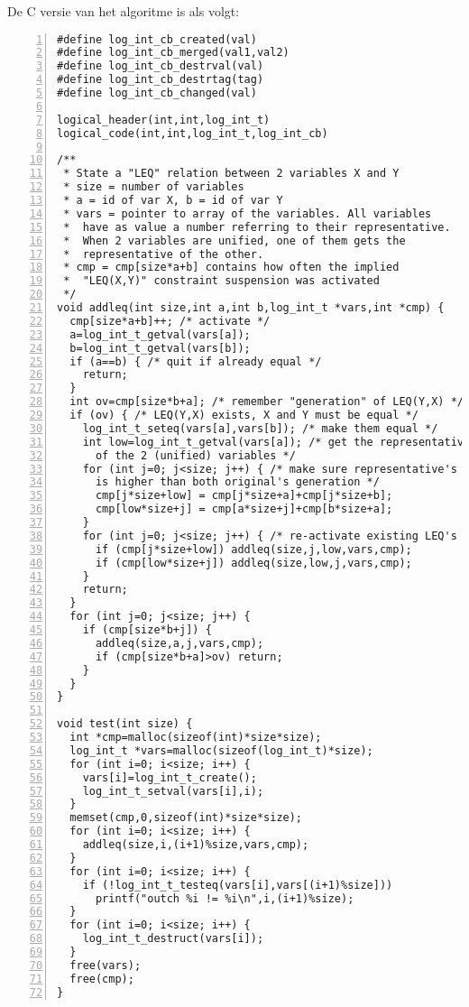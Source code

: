 \label{code:leq-c}

De C versie van het algoritme is als volgt:

{\scriptsize
\begin{Verbatim}[frame=single,numbers=left]
#define log_int_cb_created(val)
#define log_int_cb_merged(val1,val2)
#define log_int_cb_destrval(val)
#define log_int_cb_destrtag(tag)
#define log_int_cb_changed(val)

logical_header(int,int,log_int_t)
logical_code(int,int,log_int_t,log_int_cb)

/**
 * State a "LEQ" relation between 2 variables X and Y
 * size = number of variables
 * a = id of var X, b = id of var Y
 * vars = pointer to array of the variables. All variables
 *  have as value a number referring to their representative.
 *  When 2 variables are unified, one of them gets the
 *  representative of the other.
 * cmp = cmp[size*a+b] contains how often the implied
 *  "LEQ(X,Y)" constraint suspension was activated
 */
void addleq(int size,int a,int b,log_int_t *vars,int *cmp) {
  cmp[size*a+b]++; /* activate */
  a=log_int_t_getval(vars[a]);
  b=log_int_t_getval(vars[b]);
  if (a==b) { /* quit if already equal */
    return;
  }
  int ov=cmp[size*b+a]; /* remember "generation" of LEQ(Y,X) */
  if (ov) { /* LEQ(Y,X) exists, X and Y must be equal */
    log_int_t_seteq(vars[a],vars[b]); /* make them equal */
    int low=log_int_t_getval(vars[a]); /* get the representative 
      of the 2 (unified) variables */
    for (int j=0; j<size; j++) { /* make sure representative's generation
      is higher than both original's generation */
      cmp[j*size+low] = cmp[j*size+a]+cmp[j*size+b];
      cmp[low*size+j] = cmp[a*size+j]+cmp[b*size+a];
    }
    for (int j=0; j<size; j++) { /* re-activate existing LEQ's */
      if (cmp[j*size+low]) addleq(size,j,low,vars,cmp);
      if (cmp[low*size+j]) addleq(size,low,j,vars,cmp);
    }
    return;
  }
  for (int j=0; j<size; j++) {
    if (cmp[size*b+j]) {
      addleq(size,a,j,vars,cmp);
      if (cmp[size*b+a]>ov) return;
    }
  }
}

void test(int size) {
  int *cmp=malloc(sizeof(int)*size*size);
  log_int_t *vars=malloc(sizeof(log_int_t)*size);
  for (int i=0; i<size; i++) {
    vars[i]=log_int_t_create();
    log_int_t_setval(vars[i],i);
  }
  memset(cmp,0,sizeof(int)*size*size);
  for (int i=0; i<size; i++) {
    addleq(size,i,(i+1)%size,vars,cmp);
  }
  for (int i=0; i<size; i++) {
    if (!log_int_t_testeq(vars[i],vars[(i+1)%size]))
      printf("outch %i != %i\n",i,(i+1)%size);
  }
  for (int i=0; i<size; i++) {
    log_int_t_destruct(vars[i]);
  }
  free(vars);
  free(cmp);
}
\end{Verbatim}
}

